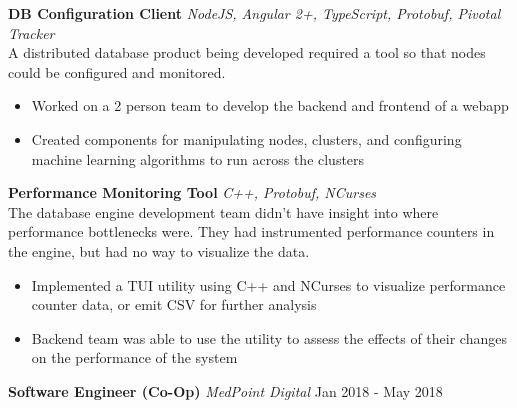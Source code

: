 \documentclass[a4paper]{article}
\begin{document}
\begin{addmargin}[1em]{2em}%
{\textbf{DB Configuration Client}} {\sl NodeJS, Angular 2+, TypeScript, Protobuf, Pivotal Tracker} \\
    A distributed database product being developed required a tool so that nodes could be configured and monitored.
\vspace*{-2mm}
\begin{itemize}[leftmargin=4.5mm] \itemsep -1mm
	\item Worked on a 2 person team to develop the backend and frontend of a webapp
	\item Created components for manipulating nodes, clusters, and configuring machine learning algorithms to run across the clusters
\end{itemize}
\vspace*{2mm}

{\textbf{Performance Monitoring Tool}} {\sl C++, Protobuf, NCurses} \\
    The database engine development team didn't have insight into where performance bottlenecks were. 
    They had instrumented performance counters in the engine, but had no way to visualize the data.
\vspace*{-2mm}
\begin{itemize}[leftmargin=4.5mm] \itemsep -1mm
	\item Implemented a TUI utility using C++ and NCurses to visualize performance counter data, or emit CSV for further analysis
	\item Backend team was able to use the utility to assess the effects of their changes on the performance of the system
\end{itemize}
\vspace*{2mm}
\end{addmargin}



\textbf{Software Engineer (Co-Op)} \textit{MedPoint Digital} \hfill Jan 2018 - May 2018\\
\end{document}

